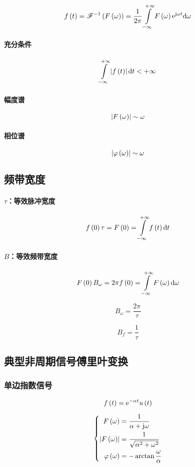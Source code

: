 \documentclass{article}
\begin{document}
\[\ft=\ifourier{\fw}=\frac1{2\pi}\impint \fw\e^{\j\omega t}\d\omega\]

\paragraph{充分条件}

\[\impint\abs\ft\d t<+\infty\]

\paragraph{幅度谱}

\[\left|F\left(\omega\right)\right|\sim \omega\]

\paragraph{相位谱}

\[\left|\varphi\left(\omega\right)\right|\sim \omega\]

\subsection{频带宽度}

\paragraph{$\tau$：等效脉冲宽度}

\[f\pare{0}\tau=F\pare{0}=\impint\ft\d t\]

\paragraph{$B$：等效频带宽度}

\[F\pare{0}B_\omega=2\pi f\pare{0}=\impint \fw\d\omega\]

\[B_\omega=\frac{2\pi}\tau\]

\[B_f=\frac1\tau\]

\subsection{典型非周期信号傅里叶变换}

\subsubsection{单边指数信号}

\[f\left(t\right)=\mathrm e^{-\alpha t}u\left(t\right)\]

\[\left\{\begin{aligned}
        F\left(\omega\right)                  & =\frac1{\alpha+\mathrm j\omega}          \\
        \left|F\left(\omega\right)\right|            & =\frac1{\sqrt{\alpha^2+\omega^2}} \\
        \varphi\left(\omega\right) & =-\arctan\frac\omega\alpha
    \end{aligned}\right.\]
\end{document}
